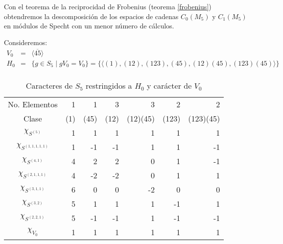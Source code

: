 \documentclass[12pt]{book}
\theoremstyle{definition}
\newcounter{in}
\begin{document}
Con el teorema de la reciprocidad de Frobenius (teorema
\ref{frobenius}) obtendremos la descomposición de los espacios de
cadenas $C_{0}(M_{5})$ y $C_{1}(M_{5})$ en módulos de Specht con un
menor número de cálculos. 

Consideremos:
\begin{eqnarray*}
  V_{0}&=&\langle\overline{45}\rangle\\
  H_{0}&=&\{g\in S_{5}\mid gV_{0}=V_{0}\}=\{\langle(1),(12),(123),(45),(12)(45),(123)(45)\rangle\}\\
\end{eqnarray*}

\begin{table}[!hbtp]
  \centering
    \begin{tabular}{c |r r r r r r}
      No. Elementos& 1 & 1 & 3 & 3 & 2 & 2 \\
      Clase & (1) & (45) & (12) & (12)(45) & (123) & (123)(45) \\
      \hline
      $\chi_{S^{(5)}}$       & 1 & 1 & 1 & 1 & 1 & 1 \\
      $\chi_{S^{(1,1,1,1,1)}}$ & 1 & -1 & -1 & 1 & 1 & -1 \\
      $\chi_{S^{(4,1)}}$      & 4 & 2 & 2 & 0 & 1 & -1 \\
      $\chi_{S^{(2,1,1,1)}}$   & 4 & -2 & -2 & 0 & 1 & 1 \\
      $\chi_{S^{(3,1,1)}}$     & 6 & 0 & 0 & -2 & 0 & 0 \\
      $\chi_{S^{(3,2)}}$      & 5 & 1 & 1 & 1 & -1 & 1 \\
      $\chi_{S^{(2,2,1)}}$    & 5 & -1 & -1 & 1 & -1 & -1 \\
      \hline
      $\chi_{V_{0}}$ & 1 & 1 & 1 & 1 & 1 & 1 \\
    \end{tabular}

\caption{Caracteres de $S_{5}$ restringidos a $H_{0}$ y carácter de $V_{0}$}
\label{tab:restriccion-H_0}
\end{table}
\end{document}
